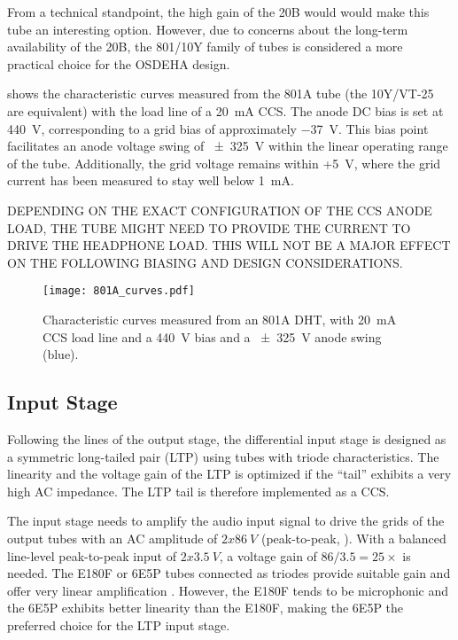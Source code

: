 From a technical standpoint, the high gain of the 20B would would make this tube an interesting option. However, due to concerns about the long-term availability of the 20B, the 801/10Y family of tubes is considered a more practical choice for the OSDEHA design.

 shows the characteristic curves measured from the 801A tube (the 10Y/VT-25 are equivalent) with the load line of a \SI{20}{mA} CCS. The anode DC bias is set at \SI{440}{V}, corresponding to a grid bias of approximately \SI{-37}{V}. This bias point facilitates an anode voltage swing of \SI{\pm325}{V} within the linear operating range of the tube. Additionally, the grid voltage remains within +\SI{5}{V}, where the grid current has been measured to stay well below \SI{1}{mA}.


DEPENDING ON THE EXACT CONFIGURATION OF THE CCS ANODE LOAD, THE TUBE MIGHT NEED TO PROVIDE THE CURRENT TO DRIVE THE HEADPHONE LOAD. THIS WILL NOT BE A MAJOR EFFECT ON THE FOLLOWING BIASING AND DESIGN CONSIDERATIONS.


\begin{figure}
\begin{center}
\texttt{[image: 801A\_curves.pdf]}
\caption{Characteristic curves measured from an 801A DHT, with \SI{20}{mA} CCS load line and a \SI{440}{V} bias and a \SI{\pm325}{V} anode swing (blue).}
\end{center}
\end{figure}


\subsection{Input Stage}
Following the lines of the output stage, the differential input stage is designed as a symmetric long-tailed pair (LTP)\cite{valvewizard_LTP} using tubes with triode characteristics. The linearity and the voltage gain of the LTP is optimized if the ``tail'' exhibits a very high AC impedance. The LTP tail is therefore implemented as a CCS.

The input stage needs to amplify the audio input signal to drive the grids of the output tubes with an AC amplitude of $2 x \SI{86}{V}$ (peak-to-peak, ). With a balanced line-level peak-to-peak input of $2 x \SI{3.5}{V}$, a voltage gain of $86 / 3.5 = 25\times$ is needed. The E180F or 6E5P tubes connected as triodes provide suitable gain and offer very linear amplification \cite{bartola_thdbenchmark,millett_pentodes,klausmobile_testerfiles}. However, the E180F tends to be microphonic\cite{osdeha_p23} and the 6E5P exhibits better linearity than the E180F\cite{osdeha_p32}, making the 6E5P the preferred choice for the LTP input stage.

